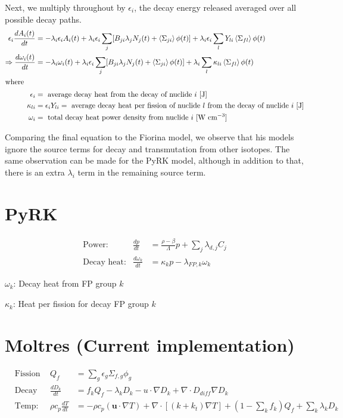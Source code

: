 \documentclass[letterpaper,11pt]{article}
\begin{document}
Next, we multiply throughout by $\epsilon_i$, the decay energy released
averaged over all possible decay paths.
%
\begin{align}
\epsilon_i \frac{dA_i (t)}{dt} &= - \lambda_i \epsilon_i A_i (t) + \lambda_i
\epsilon_i \sum_j [B_{ji} \lambda_j N_j (t) + \left<\Sigma_{ji}\right> \phi (t)]
+ \lambda_i \epsilon_i \sum_l
Y_{li} \left< \Sigma_{fl} \right> \phi (t) \\
\Rightarrow \frac{d\omega_i (t)}{dt} &= - \lambda_i \omega_i (t) + \lambda_i
\epsilon_i \sum_j [B_{ji}
\lambda_j N_j (t) + \left<\Sigma_{ji}\right> \phi (t)] + \lambda_i \sum_l
\kappa_{li} \left< \Sigma_{fl} \right> \phi (t) \\
\intertext{where}
\epsilon_i &= \text{ average decay heat from the decay of nuclide }i \text{ [J]} \nonumber \\
\kappa_{li} &= \epsilon_i Y_{li} = \text{ average decay heat per fission of nuclide $l$ from the decay of nuclide }i \text{ [J]} \nonumber \\
\omega_i &= \text{ total decay heat power density from nuclide }i \text{ [W
cm$^{-3}$]} \nonumber
\end{align}

Comparing the final equation to the Fiorina model, we observe that
his models ignore the source terms for decay and transmutation from other
isotopes. The same observation can be made for the PyRK model, although in
addition to that, there is an extra $\lambda_i$ term in the remaining source
term.

\pagebreak
%
\section*{PyRK}
%
\begin{align}
	&\text{Power:} & \frac{dp}{dt} &= \frac{\rho - \beta}{\Lambda} p + \sum_j \lambda_{d,j} C_j & \\
	&\text{Decay heat:} & \frac{d\omega_k}{dt} &= \kappa_k p - \lambda_{FP,k} \omega_k & \label{eq:2}
\end{align}

$\omega_k$: Decay heat from FP group $k$

$\kappa_k$: Heat per fission for decay FP group $k$

\section*{Moltres (Current implementation)}
%
\begin{align}
	&\text{Fission power density:} & Q_f &= \sum_g \epsilon_g \Sigma_{f,g} \phi_g & \\
	&\text{Decay heat density:} & \frac{dD_k}{dt} &= f_k Q_f - \lambda_k D_k - u \cdot\nabla D_k + \nabla \cdot D_{diff} \nabla D_k & \label{eq:4} \\
	&\text{Temp:} & \rho c_p \frac{dT}{dt} &= - \rho c_p (\boldsymbol{u} \cdot \nabla T) + \nabla \cdot [(k + k_t) \nabla T] + (1 - \sum_k f_k) Q_f + \sum_k \lambda_k D_k &
\end{align}
\end{document}
